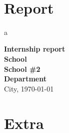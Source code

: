 \documentclass[11pt,a4paper,twoside,english,svgnames]{report}
\begin{document}
\newpage
\thispagestyle{empty}
~\\




\tableofcontents

\part{Report}




a
\glsaddall
\printglossary[title=Glossary \& index]

\nocite{*} %


\newpage\null\thispagestyle{empty}
\newpage
\thispagestyle{empty}
\begin{center}
\null %
\vfill
\Huge{\textbf{Internship report}}\\
\vspace{5cm}
\LARGE{\textbf{School}}\\
\LARGE{\textbf{School \#2}}\\
\LARGE{\textbf{Department}}\\
\vspace{5cm}
\LARGE{City, \today}\\
\vfill
\end{center}

\part{Extra}
\null
\end{document}
